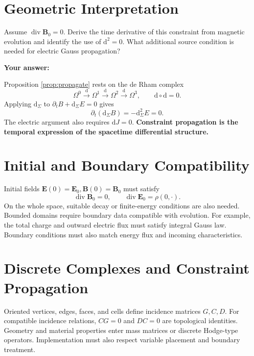 \documentclass[11pt,openany]{book}
\numberwithin{equation}{chapter}
\theoremstyle{definition}
\theoremstyle{remark}
\newcommand{\dd}{\mathrm d}
\newcommand{\Div}{\operatorname{div}}
\begin{document}
\section{Geometric Interpretation}
\begin{studentinput}
Assume $\Div\bm B_0=0$. Derive the time derivative of this constraint from magnetic evolution and identify the use of $\dd^2=0$. What additional source condition is needed for electric Gauss propagation?

\textbf{Your answer:}\vspace{2cm}
\end{studentinput}
Proposition \ref{prop:propagate} rests on the de Rham complex
\begin{equation}\label{eq:derham}
\Omega^0\xrightarrow{\dd}\Omega^1\xrightarrow{\dd}\Omega^2\xrightarrow{\dd}\Omega^3,
\qquad \dd\circ\dd=0.
\end{equation}
Applying $\dd_\Sigma$ to $\partial_tB+\dd_\Sigma E=0$ gives
\begin{equation}
\partial_t(\dd_\Sigma B)=-\dd_\Sigma^2E=0.
\end{equation}
The electric argument also requires $\dd J=0$. \textbf{Constraint propagation is the temporal expression of the spacetime differential structure.}

\section{Initial and Boundary Compatibility}
Initial fields $\bm E(0)=\bm E_0,\bm B(0)=\bm B_0$ must satisfy
\begin{equation}\label{eq:initConstraints}
\Div\bm B_0=0,
\qquad \Div\bm E_0=\rho(0,\cdot).
\end{equation}
On the whole space, suitable decay or finite-energy conditions are also needed. Bounded domains require boundary data compatible with evolution. For example, the total charge and outward electric flux must satisfy integral Gauss law. Boundary conditions must also match energy flux and incoming characteristics.

\section{Discrete Complexes and Constraint Propagation}
\begin{engineernote}
Oriented vertices, edges, faces, and cells define incidence matrices $G,C,D$. For compatible incidence relations, $CG=0$ and $DC=0$ are topological identities. Geometry and material properties enter mass matrices or discrete Hodge-type operators. Implementation must also respect variable placement and boundary treatment.
\end{engineernote}
\end{document}
